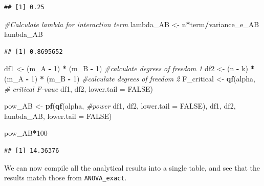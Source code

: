 \documentclass[]{book}
\newenvironment{Shaded}{\begin{snugshade}}{\end{snugshade}}
\newcommand{\CommentTok}[1]{\textcolor[rgb]{0.56,0.35,0.01}{\textit{#1}}}
\newcommand{\DataTypeTok}[1]{\textcolor[rgb]{0.13,0.29,0.53}{#1}}
\newcommand{\DecValTok}[1]{\textcolor[rgb]{0.00,0.00,0.81}{#1}}
\newcommand{\KeywordTok}[1]{\textcolor[rgb]{0.13,0.29,0.53}{\textbf{#1}}}
\newcommand{\NormalTok}[1]{#1}
\newcommand{\OperatorTok}[1]{\textcolor[rgb]{0.81,0.36,0.00}{\textbf{#1}}}
\newcommand{\OtherTok}[1]{\textcolor[rgb]{0.56,0.35,0.01}{#1}}
\newcommand{\StringTok}[1]{\textcolor[rgb]{0.31,0.60,0.02}{#1}}
\begin{document}
\begin{verbatim}
## [1] 0.25
\end{verbatim}

\begin{Shaded}
\begin{Highlighting}[]
\CommentTok{#Calculate lambda for interaction term}
\NormalTok{lambda_AB <-}\StringTok{ }\NormalTok{n}\OperatorTok{*}\NormalTok{term}\OperatorTok{/}\NormalTok{variance_e_AB}
\NormalTok{lambda_AB}
\end{Highlighting}
\end{Shaded}

\begin{verbatim}
## [1] 0.8695652
\end{verbatim}

\begin{Shaded}
\begin{Highlighting}[]
\NormalTok{df1 <-}\StringTok{ }\NormalTok{(m_A }\OperatorTok{-}\StringTok{ }\DecValTok{1}\NormalTok{) }\OperatorTok{*}\StringTok{ }\NormalTok{(m_B }\OperatorTok{-}\StringTok{ }\DecValTok{1}\NormalTok{)  }\CommentTok{#calculate degrees of freedom 1}
\NormalTok{df2 <-}
\NormalTok{(n }\OperatorTok{-}\StringTok{ }\NormalTok{k) }\OperatorTok{*}\StringTok{ }\NormalTok{(m_A }\OperatorTok{-}\StringTok{ }\DecValTok{1}\NormalTok{) }\OperatorTok{*}\StringTok{ }\NormalTok{(m_B }\OperatorTok{-}\StringTok{ }\DecValTok{1}\NormalTok{) }\CommentTok{#calculate degrees of freedom 2}
\NormalTok{F_critical <-}\StringTok{ }\KeywordTok{qf}\NormalTok{(alpha, }\CommentTok{# critical F-vaue}
\NormalTok{df1,}
\NormalTok{df2,}
\DataTypeTok{lower.tail =} \OtherTok{FALSE}\NormalTok{)}

\NormalTok{pow_AB <-}\StringTok{ }\KeywordTok{pf}\NormalTok{(}\KeywordTok{qf}\NormalTok{(alpha, }\CommentTok{#power}
\NormalTok{df1,}
\NormalTok{df2,}
\DataTypeTok{lower.tail =} \OtherTok{FALSE}\NormalTok{),}
\NormalTok{df1,}
\NormalTok{df2,}
\NormalTok{lambda_AB,}
\DataTypeTok{lower.tail =} \OtherTok{FALSE}\NormalTok{)}

\NormalTok{pow_AB}\OperatorTok{*}\DecValTok{100}
\end{Highlighting}
\end{Shaded}

\begin{verbatim}
## [1] 14.36376
\end{verbatim}

We can now compile all the analytical results into a single table, and see that the results match those from \texttt{ANOVA\_exact}.
\end{document}
